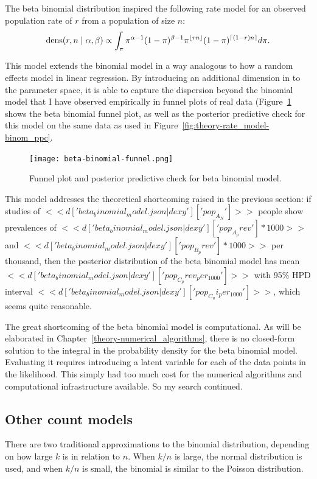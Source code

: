 The beta binomial distribution inspired the following rate model for
an observed population rate of $r$ from a population of size $n$:
\[
\operatorname{dens}(r,n\;|\; \alpha, \beta) \propto \int_{\pi}
\pi^{\alpha-1}(1-\pi)^{\beta-1} \pi^{\lfloor rn\rfloor} (1-\pi)^{\lceil (1-r)n\rceil}
d\pi.
\]

This model extends the binomial model in a way analogous to how a
random effects model in linear regression.  By introducing an
additional dimension in to the parameter space, it is able to capture
the dispersion beyond the binomial model that I have observed
empirically in funnel plots of real data
(Figure~\ref{fig:theory-rate_beta-binomial-funnel} shows the beta
binomial funnel plot, as well as the posterior predictive check for
this model on the same data as used in
Figure~\ref{fig:theory-rate_model-binom_ppc}.

\begin{figure}[ht]
\begin{center}
\texttt{[image: beta-binomial-funnel.png]}
\end{center}
\caption{Funnel plot and posterior predictive check for beta binomial model.}
\label{fig:theory-rate_beta-binomial-funnel}
\end{figure}

This model addresses the theoretical shortcoming raised in the
previous section: if studies of
$<<d['beta_binomial_model.json|dexy']['pop_A_N']>>$ people show prevalences
of $<<d['beta_binomial_model.json|dexy']['pop_A_prev']*1000>>$ and
$<<d['beta_binomial_model.json|dexy']['pop_B_prev']*1000>>$ per thousand,
then the posterior distribution of the beta binomial model has mean
$<<d['beta_binomial_model.json|dexy']['pop_C_prev_per_1000']>>$ with 95\%
HPD interval $<<d['beta_binomial_model.json|dexy']['pop_C_ui_per_1000']>>$,
which seems quite reasonable.

The great shortcoming of the beta binomial model is computational.  As
will be elaborated in Chapter~\ref{theory-numerical_algorithms}, there
is no closed-form solution to the integral in the probability density
for the beta binomial model.  Evaluating it requires introducing a
latent variable for each of the data points in the likelihood.  This
simply had too much cost for the numerical algorithms and
computational infrastructure available.  So my search
continued.

\subsection{Other count models}
There are two traditional approximations to the binomial distribution,
depending on how large $k$ is in relation to $n$.  When $k/n$ is
large, the normal distribution is used, and when $k/n$ is small, the
binomial is similar to the Poisson distribution.

